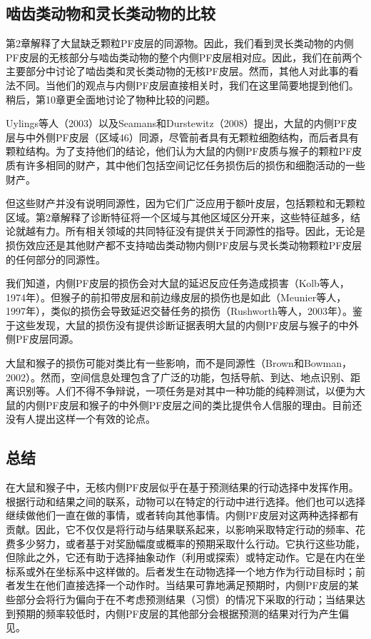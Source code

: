 \subsection{啮齿类动物和灵长类动物的比较}
第2章解释了大鼠缺乏颗粒PF皮层的同源物。因此，我们看到灵长类动物的内侧PF皮层的无核部分与啮齿类动物的整个内侧PF皮层相对应。因此，我们在前两个主要部分中讨论了啮齿类和灵长类动物的无核PF皮层。然而，其他人对此事的看法不同。当他们的观点与内侧PF皮层直接相关时，我们在这里简要地提到他们。稍后，第10章更全面地讨论了物种比较的问题。\par
Uylings等人（2003）以及Seamans和Durstewitz（2008）提出，大鼠的内侧PF皮层与中外侧PF皮层（区域46）同源，尽管前者具有无颗粒细胞结构，而后者具有颗粒结构。为了支持他们的结论，他们认为大鼠的内侧PF皮质与猴子的颗粒PF皮质有许多相同的财产，其中他们包括空间记忆任务损伤后的损伤和细胞活动的一些财产。\par
但这些财产并没有说明同源性，因为它们广泛应用于额叶皮层，包括颗粒和无颗粒区域。第2章解释了诊断特征将一个区域与其他区域区分开来，这些特征越多，结论就越有力。所有相关领域的共同特征没有提供关于同源性的指导。因此，无论是损伤效应还是其他财产都不支持啮齿类动物内侧PF皮层与灵长类动物颗粒PF皮层的任何部分的同源性。\par
我们知道，内侧PF皮层的损伤会对大鼠的延迟反应任务造成损害（Kolb等人，1974年）。但猴子的前扣带皮层和前边缘皮层的损伤也是如此（Meunier等人，1997年），类似的损伤会导致延迟交替任务的损伤（Rushworth等人，2003年）。鉴于这些发现，大鼠的损伤没有提供诊断证据表明大鼠的内侧PF皮层与猴子的中外侧PF皮层同源。\par
大鼠和猴子的损伤可能对类比有一些影响，而不是同源性（Brown和Bowman，2002）。然而，空间信息处理包含了广泛的功能，包括导航、到达、地点识别、距离识别等。人们不得不争辩说，一项任务是对其中一种功能的纯粹测试，以便为大鼠的内侧PF皮层和猴子的中外侧PF皮层之间的类比提供令人信服的理由。目前还没有人提出这样一个有效的论点。\par
\subsection{总结}
在大鼠和猴子中，无核内侧PF皮层似乎在基于预测结果的行动选择中发挥作用。根据行动和结果之间的联系，动物可以在特定的行动中进行选择。他们也可以选择继续做他们一直在做的事情，或者转向其他事情。内侧PF皮层对这两种选择都有贡献。因此，它不仅仅是将行动与结果联系起来，以影响采取特定行动的频率、花费多少努力，或者基于对奖励幅度或概率的预期采取什么行动。它执行这些功能，但除此之外，它还有助于选择抽象动作（利用或探索）或特定动作。它是在内在坐标系或外在坐标系中这样做的。后者发生在动物选择一个地方作为行动目标时；前者发生在他们直接选择一个动作时。当结果可靠地满足预期时，内侧PF皮层的某些部分会将行为偏向于在不考虑预测结果（习惯）的情况下采取的行动；当结果达到预期的频率较低时，内侧PF皮层的其他部分会根据预测的结果对行为产生偏见。\par
